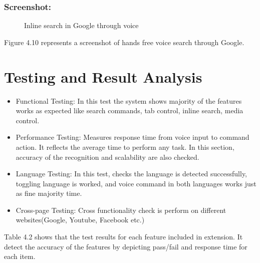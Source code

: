 \subsubsection*{Screenshot:}
\begin{figure}[H] 
    \centering
    \caption{Inline search in Google through voice}
    \label{fig:inline_search}
\end{figure}

Figure 4.10 represents a screenshot of hands free voice search through Google.

\section{Testing and Result Analysis}
\begin{itemize}
\item	Functional Testing: In this test the system shows majority of the features works as expected like search commands, tab control, inline search, media control.
\item	Performance Testing: Measures response time from voice input to command action. It reflects the average time to perform any task. In this section, accuracy of the recognition and scalability are also checked. 
\item	Language Testing: In this test, checks the language is detected successfully, toggling language is worked, and voice command in both languages works just as fine majority time.
\item	Cross-page Testing: Cross functionality check is perform on different websites(Google, Youtube, Facebook etc.)
\end{itemize}


Table 4.2 shows that the test results for each feature included in extension. It detect the accuracy of the features by depicting pass/fail and response time for each item.

